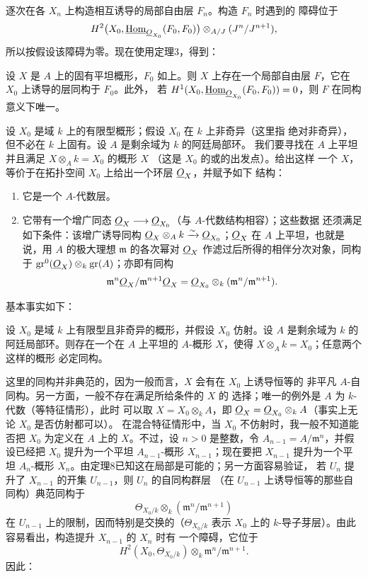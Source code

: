 逐次在各 $X_n$ 上构造相互诱导的局部自由层 $F_n$。构造 $F_n$ 时遇到的
障碍位于
\[
  H^2\bigl(X_0,\underline{\operatorname{Hom}}_{\underline{O}_{X_0}}(F_0,F_0)\bigr)
  \otimes_{A/J}(J^n/J^{n+1}),
\]
所以按假设该障碍为零。现在使用定理3，得到：

 设 $X$ 是 $A$ 上的固有平坦概形，$F_0$ 如上。则 $X$
上存在一个局部自由层 $F$，它在 $X_0$ 上诱导的层同构于 $F_0$。此外，
若 $H^1(X_0,\underline{\operatorname{Hom}}_{\underline{O}_{X_0}}(F_0,F_0))=0$，则 $F$ 在同构意义下唯一。

设 $X_0$ 是域 $k$ 上的有限型概形；假设 $X_0$ 在 $k$ 上非奇异（这里指
绝对非奇异），但不必在 $k$ 上固有。设 $A$ 是剩余域为 $k$ 的阿廷局部环。
我们要寻找在 $A$ 上平坦并且满足 $X\otimes_A k=X_0$ 的概形 $X$
（这是 $X_0$ 的或的出发点）。给出这样
一个 $X$，等价于在拓扑空间 $X_0$ 上给出一个环层 $\underline{O}_X$，并赋予如下
结构：
\begin{enumerate}
  \item[\textit{i.}] 它是一个 $A$-代数层。
  \item[\textit{ii.}] 它带有一个增广同态
    $\underline{O}_X\longrightarrow\underline{O}_{X_0}$（与 $A$-代数结构相容）；这些数据
    还须满足如下条件：该增广诱导同构
    $\underline{O}_X\otimes_A k\xrightarrow{\sim}\underline{O}_{X_0}$；$\underline{O}_X$ 在 $A$
    上平坦，也就是说，用 $A$ 的极大理想 $\mathfrak m$ 的各次幂对
    $\underline{O}_X$ 作滤过后所得的相伴分次对象，同构于
    $\operatorname{gr}^0(\underline{O}_X)\otimes_k\operatorname{gr}(A)$；亦即有同构
    \[
      \mathfrak m^n\underline{O}_X/\mathfrak m^{n+1}\underline{O}_X
      =\underline{O}_{X_0}\otimes_k(\mathfrak m^n/\mathfrak m^{n+1}).
    \]
\end{enumerate}
基本事实如下：

 设 $X_0$ 是域 $k$ 上有限型且非奇异的概形，并假设
$X_0$ 仿射。设 $A$ 是剩余域为 $k$ 的阿廷局部环。则存在一个在 $A$
上平坦的 $A$-概形 $X$，使得 $X\otimes_A k=X_0$；任意两个这样的概形
必定同构。

这里的同构并非典范的，因为一般而言，$X$ 会有在 $X_0$ 上诱导恒等的
非平凡 $A$-自同构。另一方面，一般不存在满足所给条件的 $X$ 的
选择；唯一的例外是 $A$ 为 $k$-代数（等特征情形），此时
可以取 $X=X_0\otimes_k A$，即
$\underline{O}_X=\underline{O}_{X_0}\otimes_k A$（事实上无论 $X_0$ 是否仿射都可以）。
在混合特征情形中，当 $X_0$ 不仿射时，我一般不知道能否把 $X_0$
为定义在 $A$ 上的 $X$。不过，设 $n>0$ 是整数，令
$A_{n-1}=A/\mathfrak m^n$，并假设已经把 $X_0$ 提升为一个平坦
$A_{n-1}$-概形 $X_{n-1}$；现在要把 $X_{n-1}$ 提升为一个平坦
$A_n$-概形 $X_n$。由定理8已知这在局部是可能的；另一方面容易验证，
若 $U_n$ 提升了 $X_{n-1}$ 的开集 $U_{n-1}$，则 $U_n$ 的自同构群层
（在 $U_{n-1}$ 上诱导恒等的那些自同构）典范同构于
\[
  \Theta_{X_0/k}\otimes_k(\mathfrak m^n/\mathfrak m^{n+1})
\]
在 $U_{n-1}$ 上的限制，因而特别是交换的（$\Theta_{X_0/k}$ 表示 $X_0$
上的 $k$-导子芽层）。由此容易看出，构造提升 $X_{n-1}$ 的 $X_n$ 时有
一个障碍，它位于
\[
  H^2(X_0,\Theta_{X_0/k})\otimes_k
  \mathfrak m^n/\mathfrak m^{n+1}.
\]
因此：

